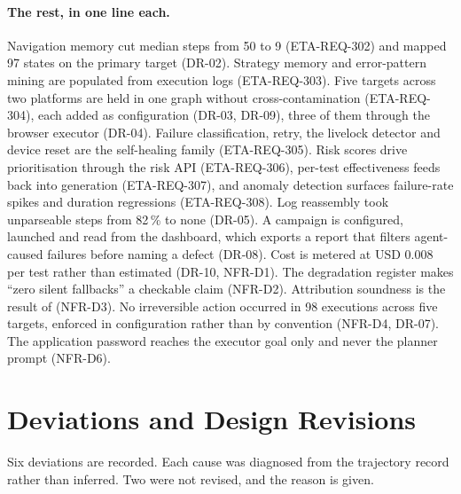\paragraph{The rest, in one line each.} Navigation memory cut median steps from
50 to 9 (ETA-REQ-302) and mapped 97 states on the primary target (DR-02).
Strategy memory and error-pattern mining are populated from execution logs
(ETA-REQ-303). Five targets across two platforms are held in one graph without
cross-contamination (ETA-REQ-304), each added as configuration (DR-03, DR-09),
three of them through the browser executor (DR-04). Failure classification,
retry, the livelock detector and device reset are the self-healing family
(ETA-REQ-305). Risk scores drive prioritisation through the risk API
(ETA-REQ-306), per-test effectiveness feeds back into generation
(ETA-REQ-307), and anomaly detection surfaces failure-rate spikes and duration
regressions (ETA-REQ-308). Log reassembly took unparseable steps from 82\,\% to
none (DR-05). A campaign is configured, launched and read from the dashboard,
which exports a report that filters agent-caused failures before naming a
defect (DR-08). Cost is metered at USD 0.008 per test rather than estimated
(DR-10, NFR-D1). The degradation register makes ``zero silent fallbacks'' a
checkable claim (NFR-D2). Attribution soundness is the result of
 (NFR-D3). No irreversible action occurred in 98
executions across five targets, enforced in configuration rather than by
convention (NFR-D4, DR-07). The application password reaches the executor goal
only and never the planner prompt (NFR-D6).

\section{Deviations and Design Revisions}
\label{sec:revisions}

Six deviations are recorded. Each cause was diagnosed from the trajectory
record rather than inferred. Two were not revised, and the reason is given.


